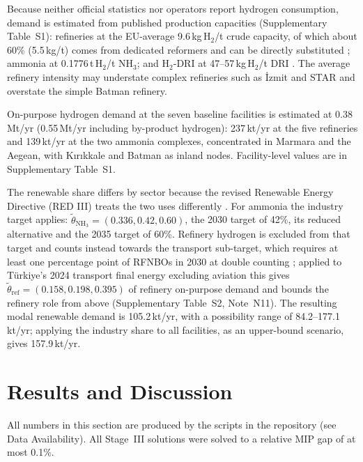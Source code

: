 \documentclass[preprint,12pt,authoryear]{elsarticle}
\begin{document}
Because neither official statistics \citep{tuncer2026enerji} nor operators report hydrogen consumption, demand is estimated from published production capacities (Supplementary Table~S1): refineries at the EU-average 9.6\,kg\,H$_2$/t crude capacity, of which about 60\% (5.5\,kg/t) comes from dedicated reformers and can be directly substituted \citep{catf2025hydrogen}; ammonia at 0.1776\,t\,H$_2$/t NH$_3$; and H$_2$-DRI at 47--57\,kg\,H$_2$/t DRI \citep{vogl2018assessment,rechberger2020green}. The average refinery intensity may understate complex refineries such as İzmit and STAR and overstate the simple Batman refinery.

On-purpose hydrogen demand at the seven baseline facilities is estimated at 0.38\,Mt/yr (0.55\,Mt/yr including by-product hydrogen): 237\,kt/yr at the five refineries and 139\,kt/yr at the two ammonia complexes, concentrated in Marmara and the Aegean, with Kırıkkale and Batman as inland nodes. Facility-level values are in Supplementary Table~S1.

The renewable share differs by sector because the revised Renewable Energy Directive (RED III) treats the two uses differently \citep{eu2023red3}. For ammonia the industry target applies: $\tilde{\theta}_{\mathrm{NH_3}} = (0.336, 0.42, 0.60)$, the 2030 target of 42\%, its reduced alternative and the 2035 target of 60\%. Refinery hydrogen is excluded from that target and counts instead towards the transport sub-target, which requires at least one percentage point of RFNBOs in 2030 at double counting \citep{h2europe2024red3,cho2026red}; applied to Türkiye's 2024 transport final energy excluding aviation \citep[1,125\,PJ;][]{tuik2026transport} this gives $\tilde{\theta}_{\mathrm{ref}} = (0.158, 0.198, 0.395)$ of refinery on-purpose demand and bounds the refinery role from above (Supplementary Table~S2, Note~N11). The resulting modal renewable demand is 105.2\,kt/yr, with a possibility range of 84.2--177.1\,kt/yr; applying the industry share to all facilities, as an upper-bound scenario, gives 157.9\,kt/yr.

\section{Results and Discussion}
All numbers in this section are produced by the scripts in the repository (see Data Availability). All Stage~III solutions were solved to a relative MIP gap of at most 0.1\%.
\end{document}
